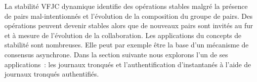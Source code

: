 La stabilité \acl{VFJC} dynamique identifie des opérations stables malgré la présence de pairs mal-intentionnés et l'évolution de la composition du groupe de pairs.
Des opérations peuvent devenir stables alors que de nouveaux pairs sont invités au fur et à mesure de l'évolution de la collaboration.
Les applications du concepts de stabilité sont nombreuses.
Elle peut par exemple être la base d'un mécanisme de consensus asynchrone.
Dans la section suivante nous explorons l'un de ses applications~: les journaux tronqués et l'authentification d'instantanés à l'aide de journaux tronqués authentifiés.

%
%
%
%
%
%


